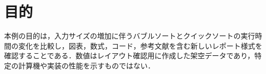 \section{目的}

本例の目的は，入力サイズの増加に伴うバブルソートとクイックソートの実行時間の変化を比較し，図表，数式，コード，参考文献を含む新しいレポート様式を確認することである．数値はレイアウト確認用に作成した架空データであり，特定の計算機や実装の性能を示すものではない．
